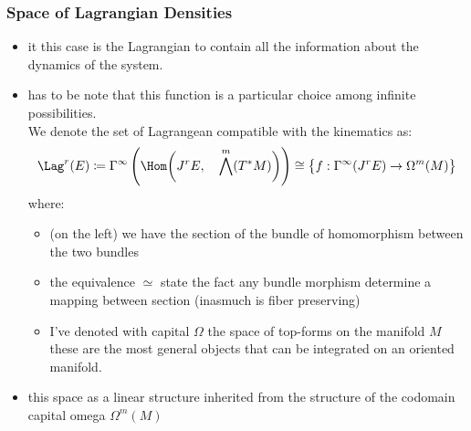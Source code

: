 \documentclass[a4paper,11pt]{scrartcl}
\begin{document}
    \subsubsection*{Space of Lagrangian Densities}
    \begin{itemize}
        \item it this case is the Lagrangian to contain all the information about the dynamics of the system.
        \item has to be note that this function is a particular choice among infinite possibilities.\\
        We denote the set of Lagrangean compatible with the kinematics as:
        $$ \Lag^r (E) \coloneqq \Gamma^\infty \left( \Hom\biggr(J^r E,\quad \bigwedge^m( T^*M)\biggr) \right) \cong \big\{f:\Gamma^\infty(J^r E) \rightarrow \Omega^m(M)  \big\} $$
        where:
        \begin{itemize}
            \item (on the left) we have the section of the bundle of homomorphism between the two bundles
            \item the equivalence $\simeq$ state the fact any bundle morphism determine a mapping between section (inasmuch is fiber preserving)
            \item I've denoted with capital $\Omega$ the space of top-forms on the manifold $M$\\
            these are the most general objects that can be integrated on an oriented manifold.
        \end{itemize}
        \item this space as a linear structure inherited from the structure of the codomain capital omega $\Omega^m(M)$
    \end{itemize}
\end{document}
